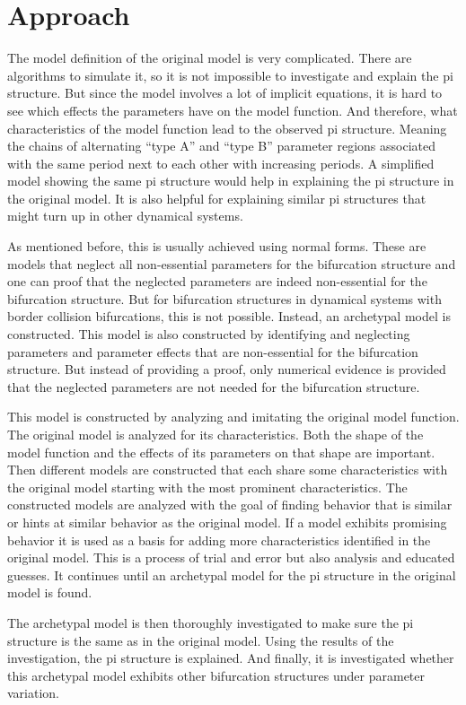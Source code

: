 \chapter{Approach}
\label{chap:approach}

The model definition of the original model is very complicated.
There are algorithms to simulate it, so it is not impossible to investigate and explain the \gls{pi} structure.
But since the model involves a lot of implicit equations, it is hard to see which effects the parameters have on the model function.
And therefore, what characteristics of the model function lead to the observed \gls{pi} structure.
Meaning the chains of alternating ``type A'' and ``type B'' parameter regions associated with the same period next to each other with increasing periods.
A simplified model showing the same \gls{pi} structure would help in explaining the \gls{pi} structure in the original model.
It is also helpful for explaining similar \gls{pi} structures that might turn up in other dynamical systems.

As mentioned before, this is usually achieved using normal forms.
These are models that neglect all non-essential parameters for the bifurcation structure and one can proof that the neglected parameters are indeed non-essential for the bifurcation structure.
But for bifurcation structures in  dynamical systems with border collision bifurcations, this is not possible.
Instead, an archetypal model is constructed.
This model is also constructed by identifying and neglecting parameters and parameter effects that are non-essential for the bifurcation structure.
But instead of providing a proof, only numerical evidence is provided that the neglected parameters are not needed for the bifurcation structure.

This model is constructed by analyzing and imitating the original model function.
The original model is analyzed for its characteristics.
Both the shape of the model function and the effects of its parameters on that shape are important.
Then different models are constructed that each share some characteristics with the original model starting with the most prominent characteristics.
The constructed models are analyzed with the goal of finding behavior that is similar or hints at similar behavior as the original model.
If a model exhibits promising behavior it is used as a basis for adding more characteristics identified in the original model.
This is a process of trial and error but also analysis and educated guesses.
It continues until an archetypal model for the \gls{pi} structure in the original model is found.

The archetypal model is then thoroughly investigated to make sure the \gls{pi} structure is the same as in the original model.
Using the results of the investigation, the \gls{pi} structure is explained.
And finally, it is investigated whether this archetypal model exhibits other bifurcation structures under parameter variation.
